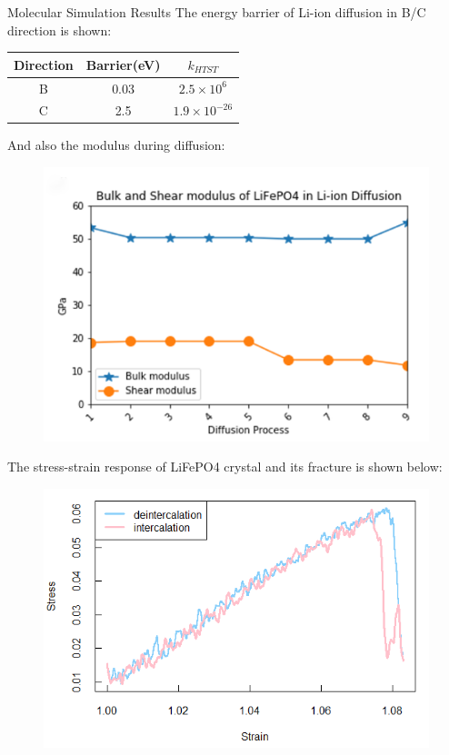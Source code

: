 \documentclass[final]{beamer}
\newlength{\onecolwid}
\newlength{\twocolwid}
\begin{document}
\begin{frame}[t]
\begin{columns}[t]
\begin{column}{\twocolwid}
\begin{columns}[t,totalwidth=\twocolwid]
\begin{column}{\onecolwid} %


\begin{block}{Molecular Simulation Results}
The energy barrier of Li-ion diffusion in B/C direction is shown:
\begin{table}
	\centering
    \begin{tabular}{ | c | c | c | }
    \hline
    \hline
    Direction & Barrier(eV) & $k_{HTST}$\\ \hline \hline
    B & 0.03 & $2.5 \times 10^6$\\
    C & 2.5 & $1.9 \times 10^{-26}$ \\
    \hline
    \hline
    \end{tabular}
\end{table}
And also the modulus during diffusion:\\
\begin{figure}
\includegraphics[width=0.8\linewidth]{modulus.png}
\end{figure}
The stress-strain response of LiFePO4 crystal and its fracture is shown below:
\begin{figure}
\includegraphics[width=0.9\linewidth]{md.png}
\end{figure}


\end{block}
\end{column}
\end{columns}
\end{column}
\end{columns}
\end{frame}
\end{document}
